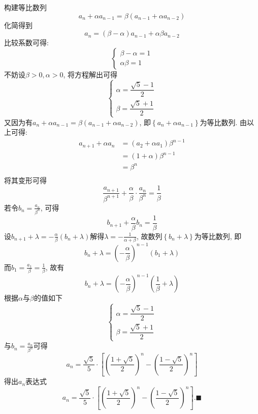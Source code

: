 \documentclass{book}
\begin{document}
    构建等比数列$${\displaystyle a_{n}+\alpha a_{n-1}=\beta (a_{n-1}+\alpha a_{n-2})}$$
    化简得到$${\displaystyle a_{n}=(\beta -\alpha )a_{n-1}+\alpha \beta a_{n-2}}$$
    比较系数可得:$${\displaystyle {\begin{cases}\beta -\alpha =1\\\alpha \beta =1\end{cases}}}$$
    不妨设${\displaystyle \beta >0,\alpha >0}$, 将方程解出可得$${\displaystyle {\begin{cases}\alpha ={\dfrac {{\sqrt {5}}-1}{2}}\\\beta ={\dfrac {{\sqrt {5}}+1}{2}}\end{cases}}}$$
    又因为有${\displaystyle a_{n}+\alpha a_{n-1}=\beta (a_{n-1}+\alpha a_{n-2})}$, 即${\displaystyle \left\{a_{n}+\alpha a_{n-1}\right\}}$为等比数列.
    由以上可得:$${\displaystyle {\begin{aligned}a_{n+1}+\alpha a_{n}&=(a_{2}+\alpha a_{1})\beta ^{n-1}\\&=(1+\alpha )\beta ^{n-1}\\&=\beta ^{n}\\\end{aligned}}}$$
    将其变形可得$${\displaystyle {\frac {a_{n+1}}{\beta ^{n+1}}}+{\frac {\alpha }{\beta }}\cdot {\frac {a_{n}}{\beta ^{n}}}={\frac {1}{\beta }}}$$
    若令${\displaystyle b_{n}={\frac {a_{n}}{\beta ^{n}}}}$, 可得$${\displaystyle b_{n+1}+{\frac {\alpha }{\beta }}b_{n}={\frac {1}{\beta }}}$$
    设${\displaystyle b_{n+1}+\lambda =-{\frac {\alpha }{\beta }}(b_{n}+\lambda )}$解得${\displaystyle \lambda =-{\frac {1}{\alpha +\beta }}}$, 故数列${\displaystyle \left\{b_{n}+\lambda \right\}}$为等比数列, 即$${\displaystyle b_{n}+\lambda =\left(-{\frac {\alpha }{\beta }}\right)^{n-1}\left(b_{1}+\lambda \right)}$$
    而${\displaystyle b_{1}={\frac {a_{1}}{\beta }}={\frac {1}{\beta }}}$, 故有$${\displaystyle b_{n}+\lambda =\left(-{\frac {\alpha }{\beta }}\right)^{n-1}\left({\frac {1}{\beta }}+\lambda \right)}$$
    根据$\alpha$与$\beta$的值如下 $${\displaystyle {\begin{cases}\alpha ={\dfrac {{\sqrt {5}}-1}{2}}\\\beta ={\dfrac {{\sqrt {5}}+1}{2}}\end{cases}}} $$
    与${\displaystyle b_{n}={\frac {a_{n}}{\beta ^{n}}}}$可得$${\displaystyle a_{n}={\frac {\sqrt {5}}{5}}\cdot \left[\left({\frac {1+{\sqrt {5}}}{2}}\right)^{n}-\left({\frac {1-{\sqrt {5}}}{2}}\right)^{n}\right]}$$得出$    {\displaystyle {a_{n}}}$表达式$${\displaystyle a_{n}={\frac {\sqrt {5}}{5}}\cdot \left[\left({\frac {1+{\sqrt {5}}}{2}}\right)^{n}-\left({\frac {1-{\sqrt {5}}}{2}}\right)^{n}\right]}.\blacksquare$$ \cite{Fibonacci}
\end{document}
